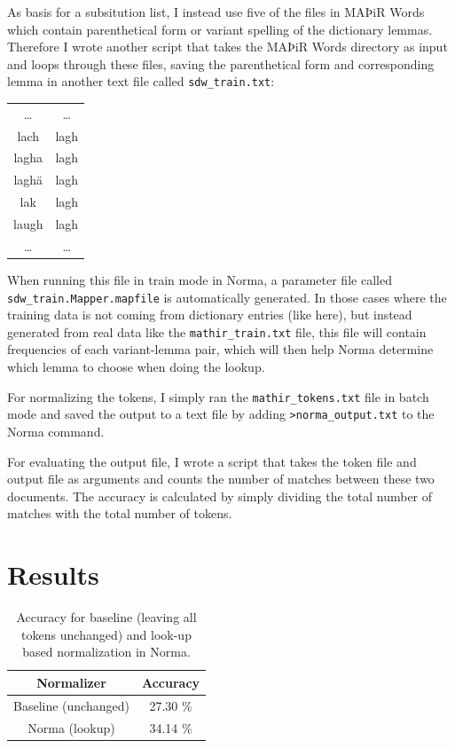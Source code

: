 \documentclass[11pt,a4paper]{article}
\begin{document}
As basis for a subsitution list, I instead use five of the files in MAÞiR Words which contain parenthetical form or variant spelling of the dictionary lemmas. Therefore I wrote another script that takes the MAÞiR Words directory as input and loops through these files, saving the parenthetical form and corresponding lemma in another text file called \texttt{sdw\_train.txt}: 

    \begin{table}[H]
    \centering
    \begin{tabular}{c|c}
        \ldots & \ldots \\
        lach & lagh \\
        lagha & lagh \\
        laghä & lagh \\
        lak & lagh \\ 
        laugh &	lagh \\ 
        \ldots & \ldots
    \end{tabular}
    \end{table}

When running this file in train mode in Norma, a parameter file called \texttt{sdw\_train.Mapper.mapfile} is automatically generated. In those cases where the training data is not coming from dictionary entries (like here), but instead generated from real data like the \texttt{mathir\_train.txt} file, this file will contain frequencies of each variant-lemma pair, which will then help Norma determine which lemma to choose when doing the lookup.

For normalizing the tokens, I simply ran the \texttt{mathir\_tokens.txt} file in batch mode and saved the output to a text file by adding \texttt{>norma\_output.txt} to the Norma command.     

For evaluating the output file, I wrote a script that takes the token file and output file as arguments and counts the number of matches between these two documents. The accuracy is calculated by simply dividing the total number of matches with the total number of tokens.

\section{Results}

    \begin{table}[H]
    \centering
    \begin{tabular}{c|c}
        \hline
        \textbf{Normalizer} & \textbf{Accuracy} \\
         \hline
        Baseline (unchanged) & 27.30 \% \\
        \hline
        Norma (lookup) & 34.14 \%  \\
        \hline
    \end{tabular}
    \caption{\label{tab:table-results}Accuracy for baseline (leaving all tokens unchanged) and look-up based normalization in Norma.}
    \end{table}
\end{document}
